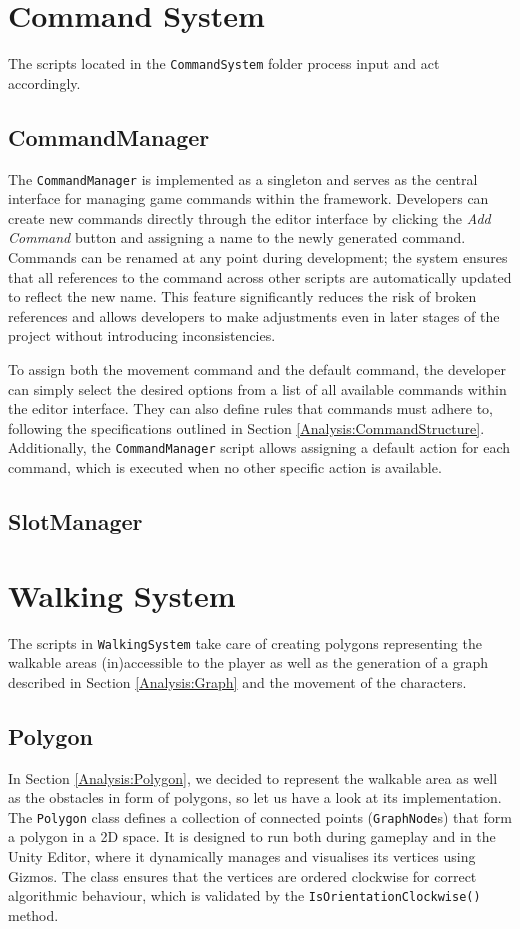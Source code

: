 \section{Command System}
The scripts located in the \verb|CommandSystem| folder process input and act accordingly.

\subsection{CommandManager}
The \verb|CommandManager| is implemented as a singleton and serves as the central interface for managing game commands within the framework. Developers can create new commands directly through the editor interface by clicking the \textit{Add Command} button and assigning a name to the newly generated command. Commands can be renamed at any point during development; the system ensures that all references to the command across other scripts are automatically updated to reflect the new name. This feature significantly reduces the risk of broken references and allows developers to make adjustments even in later stages of the project without introducing inconsistencies.

To assign both the movement command and the default command, the developer can simply select the desired options from a list of all available commands within the editor interface. They can also define rules that commands must adhere to, following the specifications outlined in Section \ref{Analysis:CommandStructure}. Additionally, the \verb|CommandManager| script allows assigning a default action for each command, which is executed when no other specific action is available.

\subsection{SlotManager}


\section{Walking System}
The scripts in \verb|WalkingSystem| take care of creating polygons representing the walkable areas (in)accessible to the player as well as the generation of a graph described in Section \ref{Analysis:Graph} and the movement of the characters.

\subsection{Polygon}
In Section \ref{Analysis:Polygon}, we decided to represent the walkable area as well as the obstacles in form of polygons, so let us have a look at its implementation. The \verb|Polygon| class defines a collection of connected points (\verb|GraphNode|s) that form a polygon in a 2D space. It is designed to run both during gameplay and in the Unity Editor, where it dynamically manages and visualises its vertices using Gizmos. The class ensures that the vertices are ordered clockwise for correct algorithmic behaviour, which is validated by the \verb|IsOrientationClockwise()| method.

